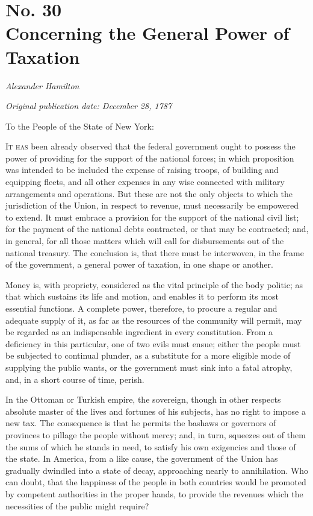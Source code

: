 \chapter[No. 30: Concerning the General Power of Taxation]{No. 30\\ {\small Concerning the General Power of Taxation}}

\textit{Alexander Hamilton}

\textit{Original publication date: December 28, 1787}
\vspace{1cm}

To the People of the State of New York:
\vspace{.4cm}

\textsc{It has} been already observed that the federal government ought to possess the power of providing for the support of the national forces; in which proposition was intended to be included the expense of raising troops, of building and equipping fleets, and all other expenses in any wise connected with military arrangements and operations. 
But these are not the only objects to which the jurisdiction of the Union, in respect to revenue, must necessarily be empowered to extend. 
It must embrace a provision for the support of the national civil list; for the payment of the national debts contracted, or that may be contracted; and, in general, for all those matters which will call for disbursements out of the national treasury. 
The conclusion is, that there must be interwoven, in the frame of the government, a general power of taxation, in one shape or another.

Money is, with propriety, considered as the vital principle of the body politic; as that which sustains its life and motion, and enables it to perform its most essential functions. 
A complete power, therefore, to procure a regular and adequate supply of it, as far as the resources of the community will permit, may be regarded as an indispensable ingredient in every constitution. 
From a deficiency in this particular, one of two evils must ensue; either the people must be subjected to continual plunder, as a substitute for a more eligible mode of supplying the public wants, or the government must sink into a fatal atrophy, and, in a short course of time, perish.

In the Ottoman or Turkish empire, the sovereign, though in other respects absolute master of the lives and fortunes of his subjects, has no right to impose a new tax. 
The consequence is that he permits the bashaws or governors of provinces to pillage the people without mercy; and, in turn, squeezes out of them the sums of which he stands in need, to satisfy his own exigencies and those of the state. 
In America, from a like cause, the government of the Union has gradually dwindled into a state of decay, approaching nearly to annihilation. 
Who can doubt, that the happiness of the people in both countries would be promoted by competent authorities in the proper hands, to provide the revenues which the necessities of the public might require?

